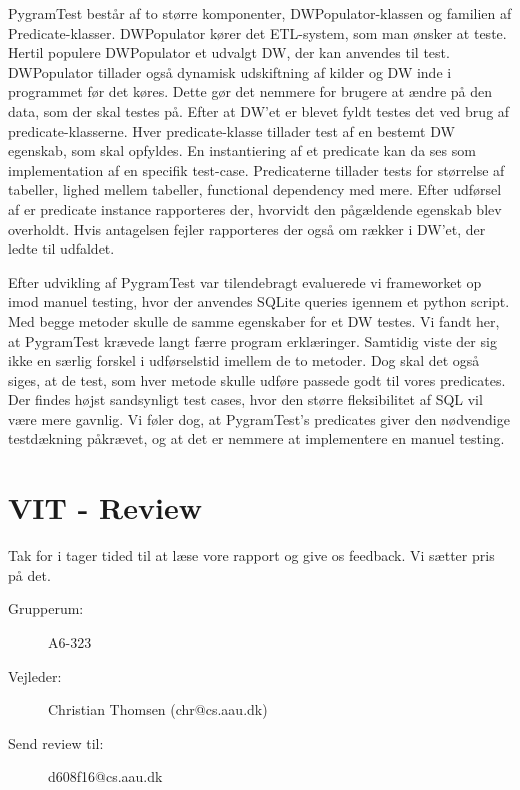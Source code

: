 PygramTest består af to større komponenter, DWPopulator-klassen og familien af Predicate-klasser. DWPopulator kører det ETL-system, som man ønsker at teste. Hertil populere DWPopulator  et udvalgt DW, der kan anvendes til test. DWPopulator tillader også dynamisk udskiftning af kilder og DW inde i programmet før det køres. Dette gør det nemmere for brugere at ændre på den data, som der skal testes på. Efter at DW’et er blevet fyldt testes det ved brug af predicate-klasserne. Hver predicate-klasse tillader test af en bestemt DW egenskab, som skal opfyldes. En instantiering af et predicate kan da ses som implementation af en specifik test-case. Predicaterne tillader tests for størrelse af tabeller, lighed mellem tabeller, functional dependency med mere. Efter udførsel af er predicate instance rapporteres der, hvorvidt den pågældende egenskab blev overholdt. Hvis antagelsen fejler rapporteres der også om rækker i DW’et, der ledte til udfaldet. 

Efter udvikling af PygramTest var tilendebragt evaluerede vi frameworket op imod manuel testing, hvor der anvendes SQLite queries igennem et python script. Med begge metoder skulle de samme egenskaber for et DW testes. Vi fandt her, at PygramTest krævede langt færre program erklæringer. Samtidig viste der sig ikke en særlig forskel i udførselstid imellem de to metoder. Dog skal det også siges, at de test, som hver metode skulle udføre passede godt til vores predicates. Der findes højst sandsynligt test cases, hvor den større fleksibilitet af SQL vil være mere gavnlig. Vi føler dog, at PygramTest’s predicates giver den nødvendige testdækning påkrævet, og at det er nemmere at implementere en manuel testing.

\section*{VIT - Review}
Tak for i tager tided til at læse vore rapport og give os feedback. Vi sætter pris på det.
\begin{description}
\item[Grupperum:] A6-323
\item[Vejleder:]Christian Thomsen (chr@cs.aau.dk)
\item[Send review til:] d608f16@cs.aau.dk
\end{description}








